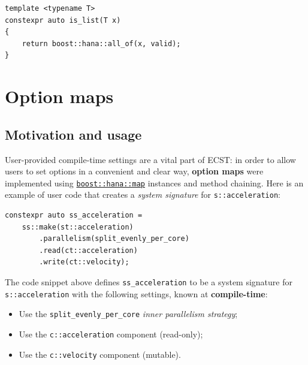 \documentclass[oneside, 12pt, a4paper, openany]{book}
\begin{document}
\begin{verbatim}
template <typename T>
constexpr auto is_list(T x)
{
    return boost::hana::all_of(x, valid);
}
\end{verbatim}

\hypertarget{metaprogramming_option_maps}{\section{Option
maps}\label{metaprogramming_option_maps}}

\subsection{Motivation and usage}\label{motivation-and-usage-1}

User-provided compile-time settings are a vital part of ECST: in order
to allow users to set options in a convenient and clear way,
\textbf{option maps} were implemented using
\href{http://www.boost.org/doc/libs/1_61_0/libs/hana/doc/html/structboost_1_1hana_1_1map.html}{\texttt{boost::hana::map}}
instances and method chaining. Here is an example of user code that
creates a \emph{system signature} for
\texttt{s::acceleration}:

\begin{verbatim}
constexpr auto ss_acceleration =
    ss::make(st::acceleration)
        .parallelism(split_evenly_per_core)
        .read(ct::acceleration)
        .write(ct::velocity);
\end{verbatim}

The code snippet above defines
\texttt{ss_acceleration}
to be a system signature for
\texttt{s::acceleration}
with the following settings, known at \textbf{compile-time}:

\begin{itemize}
\item
  Use the
  \texttt{split_evenly_per_core}
  \emph{inner parallelism strategy};
\item
  Use the
  \texttt{c::acceleration}
  component (read-only);
\item
  Use the
  \texttt{c::velocity}
  component (mutable).
\end{itemize}
\end{document}
